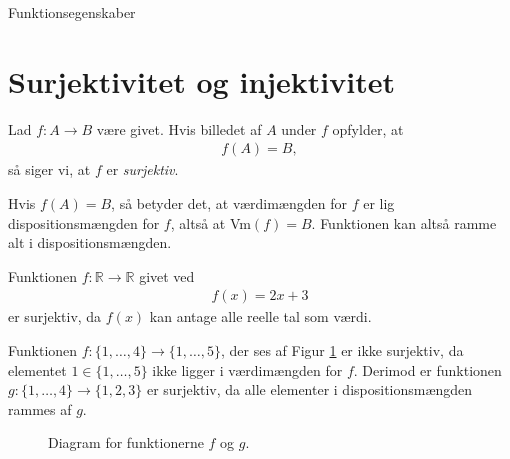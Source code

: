 
\begin{center}
\Huge
	Funktionsegenskaber
\end{center}
\section*{Surjektivitet og injektivitet}

\begin{defn}
Lad $f:A \to B$ være givet. Hvis billedet af $A$ under $f$ opfylder, at 
\begin{align*}
f(A) = B, 
\end{align*}
så siger vi, at $f$ er \textit{surjektiv}. 
\end{defn}
Hvis $f(A) = B$, så betyder det, at værdimængden for $f$ er lig dispositionsmængden for $f$, altså at Vm$(f) = B.$ Funktionen kan altså ramme alt i dispositionsmængden. 
\begin{exa}
Funktionen $f:\mathbb{R} \to \mathbb{R}$ givet ved
\begin{align*}
f(x) = 2x+3
\end{align*}
er surjektiv, da $f(x)$ kan antage alle reelle tal som værdi.
\end{exa}
\begin{exa}
Funktionen $f:\{1,\hdots,4\} \to \{1,\hdots,5\}$, der ses af Figur \ref{fig:ikkesur} er ikke surjektiv, da elementet $1\in \{1,\hdots,5\}$ ikke ligger i værdimængden for $f$. Derimod er funktionen $g: \{1,\hdots,4\} \to \{1,2,3\}$ er surjektiv, da alle elementer i dispositionsmængden rammes af $g$.
\begin{figure}[H]
\centering
{}
\caption{Diagram for funktionerne $f$ og $g$.}
\label{fig:ikkesur}
\end{figure}
\end{exa}


